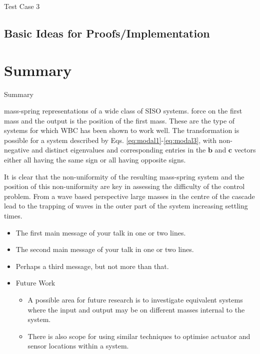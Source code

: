 \documentclass{beamer}
\begin{document}
\begin{frame}{Test Case 3}
\begin{center}
    
\end{center}
\end{frame}

\subsection{Basic Ideas for Proofs/Implementation}


\section{Summary}

\begin{frame}{Summary}

mass-spring representations of a wide class of SISO systems.
force on the first mass and the output is the position of the first mass.
These are the type of systems for which WBC has been shown to work well.
The transformation is possible for a system described by Eqs. \ref{eq:modal1}-\ref{eq:modal3}, with non-negative and distinct eigenvalues and corresponding entries in the $\mathbf{b}$ and $\mathbf{c}$ vectors either all having the same sign or all having opposite signs.

It is clear that the non-uniformity of the resulting mass-spring system and the position of this non-uniformity are key in assessing the difficulty of the control problem.
From a wave based perspective large masses in the centre of the cascade lead to the trapping of waves in the outer part of the system increasing settling times.

  \begin{itemize}
  \item
    The \alert{first main message} of your talk in one or two lines.
  \item
    The \alert{second main message} of your talk in one or two lines.
  \item
    Perhaps a \alert{third message}, but not more than that.
  \item
    Future Work
    \begin{itemize}
    \item A possible area for future research is to investigate equivalent systems where the input and output may be on different masses internal to the system.
    \item There is also scope for using similar techniques to optimise actuator and sensor locations within a system.
    \end{itemize}
    
  \end{itemize}
\end{frame}
\end{document}
